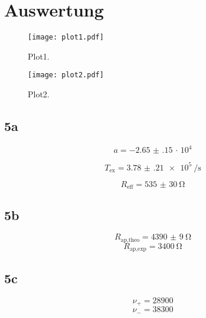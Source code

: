 \section{Auswertung}
\label{sec:Auswertung}

\begin{figure}
  \centering
  \texttt{[image: plot1.pdf]}
  \caption{Plot1.}
  \label{fig:plot1}
\end{figure}

\begin{figure}
  \centering
  \texttt{[image: plot2.pdf]}
  \caption{Plot2.}
  \label{fig:plot2}
\end{figure}


\subsection{5a}
\begin{equation}
   a = \num{-2.65(15)}\, \cdot\, 10^{4}
\end{equation}

\begin{equation}
   T_{\text{ex}} = \SI{3.78(21)e5}{\per\second}
\end{equation}

\begin{equation}
R_{\text{eff}} = \SI{535(30)}{\ohm}
\end{equation}


\subsection{5b}

\begin{equation}
  R_{\text{ap,theo}} = \SI{4390(9)}{\ohm}
  \end{equation}
\begin{equation}
  R_{\text{ap,exp}} = \SI{3400}{\ohm}
\end{equation}


\subsection{5c}

\begin{equation}
  \nu_{+} = 28900
\end{equation}
\begin{equation}
  \nu_{-} = 38300
\end{equation}
